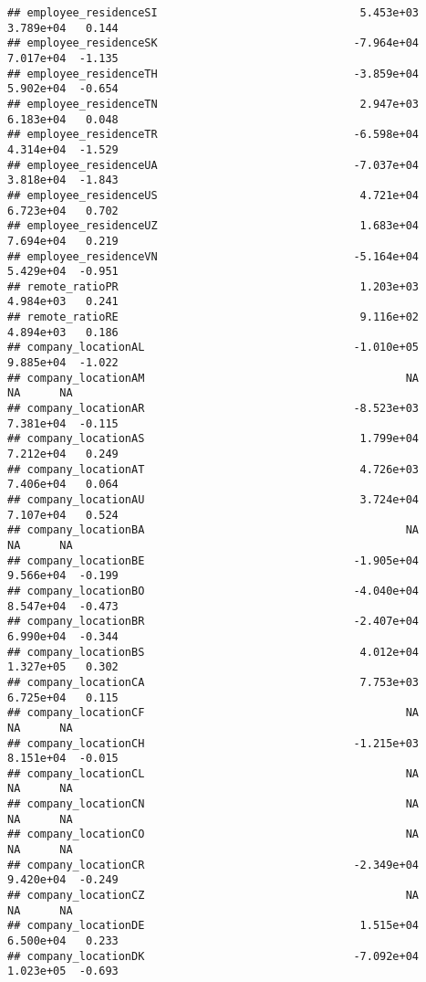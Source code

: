 \documentclass[
]{article}
\begin{document}
\begin{verbatim}
## employee_residenceSI                               5.453e+03  3.789e+04   0.144
## employee_residenceSK                              -7.964e+04  7.017e+04  -1.135
## employee_residenceTH                              -3.859e+04  5.902e+04  -0.654
## employee_residenceTN                               2.947e+03  6.183e+04   0.048
## employee_residenceTR                              -6.598e+04  4.314e+04  -1.529
## employee_residenceUA                              -7.037e+04  3.818e+04  -1.843
## employee_residenceUS                               4.721e+04  6.723e+04   0.702
## employee_residenceUZ                               1.683e+04  7.694e+04   0.219
## employee_residenceVN                              -5.164e+04  5.429e+04  -0.951
## remote_ratioPR                                     1.203e+03  4.984e+03   0.241
## remote_ratioRE                                     9.116e+02  4.894e+03   0.186
## company_locationAL                                -1.010e+05  9.885e+04  -1.022
## company_locationAM                                        NA         NA      NA
## company_locationAR                                -8.523e+03  7.381e+04  -0.115
## company_locationAS                                 1.799e+04  7.212e+04   0.249
## company_locationAT                                 4.726e+03  7.406e+04   0.064
## company_locationAU                                 3.724e+04  7.107e+04   0.524
## company_locationBA                                        NA         NA      NA
## company_locationBE                                -1.905e+04  9.566e+04  -0.199
## company_locationBO                                -4.040e+04  8.547e+04  -0.473
## company_locationBR                                -2.407e+04  6.990e+04  -0.344
## company_locationBS                                 4.012e+04  1.327e+05   0.302
## company_locationCA                                 7.753e+03  6.725e+04   0.115
## company_locationCF                                        NA         NA      NA
## company_locationCH                                -1.215e+03  8.151e+04  -0.015
## company_locationCL                                        NA         NA      NA
## company_locationCN                                        NA         NA      NA
## company_locationCO                                        NA         NA      NA
## company_locationCR                                -2.349e+04  9.420e+04  -0.249
## company_locationCZ                                        NA         NA      NA
## company_locationDE                                 1.515e+04  6.500e+04   0.233
## company_locationDK                                -7.092e+04  1.023e+05  -0.693

\end{verbatim}
\end{document}

